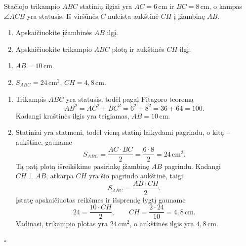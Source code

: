 \begin{salyga}
Stačiojo trikampio $ABC$ statinių ilgiai yra $AC=6\,\text{cm}$ ir
$BC=8\,\text{cm}$, o kampas $\angle ACB$ yra statusis. Iš viršūnės $C$
nuleista aukštinė $CH$ į įžambinę $AB$.
\begin{enumerate}[label=\alph*)]
  \item Apskaičiuokite įžambinės $AB$ ilgį.
  \item Apskaičiuokite trikampio $ABC$ plotą ir aukštinės $CH$ ilgį.
\end{enumerate}
\end{salyga}

\begin{atsakymas}
\begin{enumerate}[label=\alph*)]
  \item $AB=10\,\text{cm}$.
  \item $S_{ABC}=24\,\text{cm}^2$, $CH=4{,}8\,\text{cm}$.
\end{enumerate}
\end{atsakymas}

\begin{sprendimas}
\begin{enumerate}[label=\alph*)]
  \item Trikampis $ABC$ yra statusis, todėl pagal Pitagoro teoremą
  \[
    AB^2=AC^2+BC^2=6^2+8^2=36+64=100.
  \]
  Kadangi kraštinės ilgis yra teigiamas, $AB=10\,\text{cm}$.

  \item Statiniai yra statmeni, todėl vieną statinį laikydami pagrindu,
  o kitą – aukštine, gauname
  \[
    S_{ABC}=\frac{AC\cdot BC}{2}
    =\frac{6\cdot8}{2}=24\,\text{cm}^2.
  \]
  Tą patį plotą išreikškime pasirinkę įžambinę $AB$ pagrindu. Kadangi
  $CH\perp AB$, atkarpa $CH$ yra šio pagrindo aukštinė, taigi
  \[
    S_{ABC}=\frac{AB\cdot CH}{2}.
  \]
  Įstatę apskaičiuotas reikšmes ir išsprendę lygtį gauname
  \[
    24=\frac{10\cdot CH}{2},\qquad
    CH=\frac{2\cdot24}{10}=4{,}8\,\text{cm}.
  \]
  Vadinasi, trikampio plotas yra $24\,\text{cm}^2$, o aukštinės ilgis
  yra $4{,}8\,\text{cm}$.
\end{enumerate}
\hfill$\square$
\end{sprendimas}
